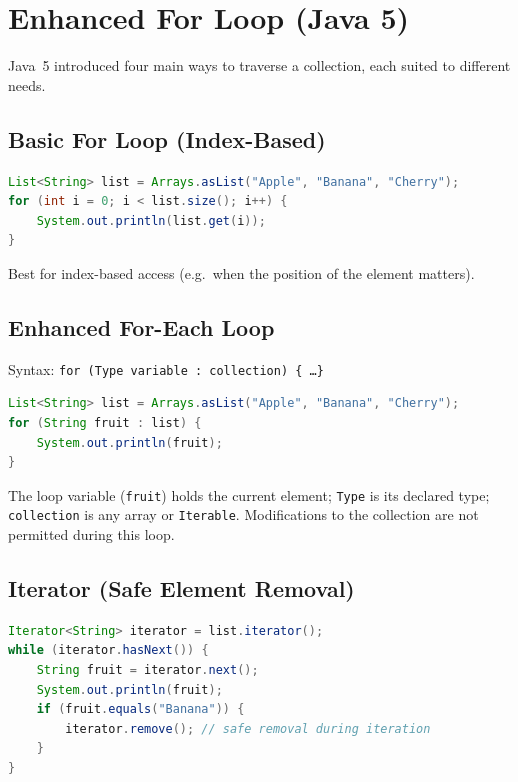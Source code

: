 \documentclass[11pt, a4paper, notitlepage]{report}
\theoremstyle{definition}
\theoremstyle{remark}
\theoremstyle{definition}
\begin{document}
\section{Enhanced For Loop (Java 5)}
\label{sec:ch10-enhanced-for}

Java~5 introduced four main ways to traverse a collection, each suited to different needs.

\subsection{Basic For Loop (Index-Based)}
\label{subsec:ch10-basic-for}
\begin{lstlisting}[language=Java]
List<String> list = Arrays.asList("Apple", "Banana", "Cherry");
for (int i = 0; i < list.size(); i++) {
    System.out.println(list.get(i));
}
\end{lstlisting}
Best for index-based access (e.g.\ when the position of the element matters).

\subsection{Enhanced For-Each Loop}
\label{subsec:ch10-foreach}

Syntax: \texttt{for (Type variable : collection) \{ \ldots \}}

\begin{lstlisting}[language=Java]
List<String> list = Arrays.asList("Apple", "Banana", "Cherry");
for (String fruit : list) {
    System.out.println(fruit);
}
\end{lstlisting}

The loop variable (\texttt{fruit}) holds the current element; \texttt{Type} is its
declared type; \texttt{collection} is any array or \texttt{Iterable}.  Modifications
to the collection are not permitted during this loop.

\subsection{Iterator (Safe Element Removal)}
\label{subsec:ch10-iterator}
\begin{lstlisting}[language=Java]
Iterator<String> iterator = list.iterator();
while (iterator.hasNext()) {
    String fruit = iterator.next();
    System.out.println(fruit);
    if (fruit.equals("Banana")) {
        iterator.remove(); // safe removal during iteration
    }
}
\end{lstlisting}
\end{document}
